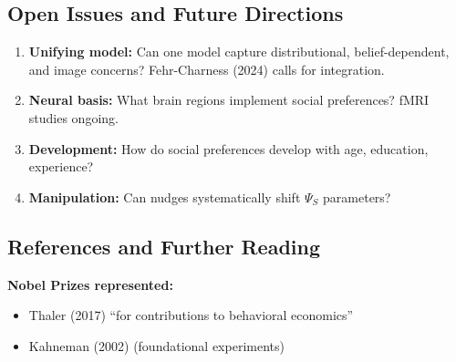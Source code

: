 \subsection{Open Issues and Future Directions}
\label{sec:aj-open-issues}


\begin{enumerate}
    \item \textbf{Unifying model:} Can one model capture distributional, belief-dependent,
    and image concerns? Fehr-Charness (2024) calls for integration.

    \item \textbf{Neural basis:} What brain regions implement social preferences?
    fMRI studies ongoing.

    \item \textbf{Development:} How do social preferences develop with age,
    education, experience?

    \item \textbf{Manipulation:} Can nudges systematically shift $\Psi_S$ parameters?
\end{enumerate}

\subsection{References and Further Reading}
\label{sec:aj-references}


\textbf{Nobel Prizes represented:}
\begin{itemize}[nosep]
    \item Thaler (2017) ``for contributions to behavioral economics''
    \item Kahneman (2002) (foundational experiments)
\end{itemize}

